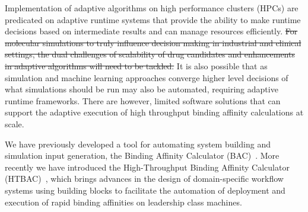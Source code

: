 Implementation of adaptive algorithms on high performance clusters (HPCs) are 
predicated on adaptive runtime systems that provide the ability to make runtime 
decisions based on intermediate results and can manage resources efficiently. 
 \sout{For molecular simulations to truly influence decision making
in industrial and clinical settings, the dual challenges of scalability of
drug candidates and enhancements in adaptive algorithms will need to be
tackled.} It is also possible that as simulation and machine learning
approaches converge higher level decisions of what simulations should be run
may also be automated, requiring adaptive runtime frameworks. There are
however, limited software solutions that can support the adaptive execution of
high throughput binding affinity calculations at scale. 











We have previously developed a tool for automating
system building and simulation input generation, the Binding Affinity
Calculator (BAC)~\cite{Sadiq2008}. More recently we have introduced the 
High-Throughput Binding Affinity Calculator (HTBAC)~\cite{dakka2017}, 
which brings advances in the design of domain-specific workflow systems 
using building blocks to facilitate the automation of deployment 
and execution of rapid binding affinities on leadership class machines. 

